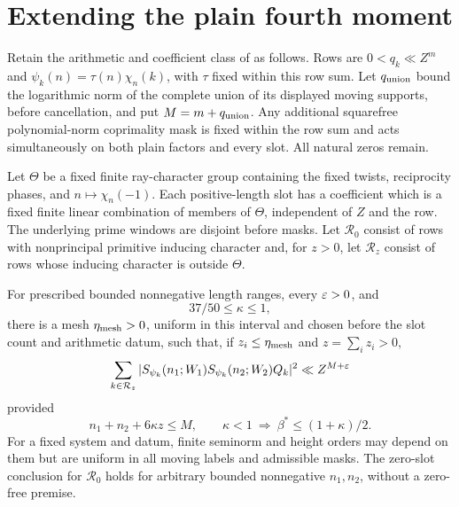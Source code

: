 \section{Extending the plain fourth moment}\label{sec:fourth}
\begin{theorem}\label{thm:fourth}
Retain the arithmetic and coefficient class of  as follows. Rows are $0<q_k\ll Z^m$ and $\psi_k(n)=\tau(n)\chi_n(k)$, with $\tau$ fixed within this row sum. Let $q_{\rm union}$ bound the logarithmic norm of the complete union of its displayed moving supports, before cancellation, and put $M=m+q_{\rm union}$. Any additional squarefree polynomial-norm coprimality mask is fixed within the row sum and acts simultaneously on both plain factors and every slot. All natural zeros remain.

Let $\Theta$ be a fixed finite ray-character group containing the fixed twists, reciprocity phases, and $n\mapsto\chi_n(-1)$. Each positive-length slot has a coefficient which is a fixed finite linear combination of members of $\Theta$, independent of $Z$ and the row. The underlying prime windows are disjoint before masks. Let $\mathcal R_0$ consist of rows with nonprincipal primitive inducing character and, for $z>0$, let $\mathcal R_z$ consist of rows whose inducing character is outside $\Theta$.

For prescribed bounded nonnegative length ranges, every $\varepsilon>0$, and
\[
 37/50\le\kappa\le1,
\]
there is a mesh $\eta_{\rm mesh}>0$, uniform in this interval and chosen before the slot count and arithmetic datum, such that, if $z_i\le\eta_{\rm mesh}$ and $z=\sum_i z_i>0$,
\begin{equation}\label{eq:extendedmoment}
 \sum_{k\in\mathcal R_z}
 |S_{\psi_k}(n_1;W_1)S_{\psi_k}(n_2;W_2)Q_k|^2
 \ll Z^{M+\varepsilon}
\end{equation}
provided
\begin{equation}\label{eq:momentboundary}
 n_1+n_2+6\kappa z\le M,
 \qquad \kappa<1\ \Longrightarrow\ \beta^*\le(1+\kappa)/2.
\end{equation}
For a fixed system and datum, finite seminorm and height orders may depend on them but are uniform in all moving labels and admissible masks. The zero-slot conclusion for $\mathcal R_0$ holds for arbitrary bounded nonnegative $n_1,n_2$, without a zero-free premise.
\end{theorem}
